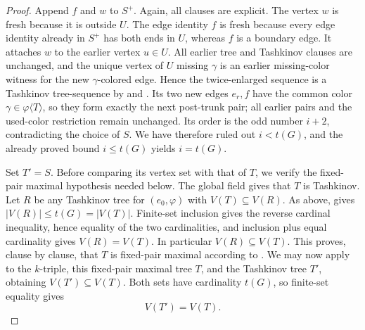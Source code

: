 \begin{proof}
Append $f$ and $w$ to $S^+$.  Again, all clauses are explicit.  The
vertex $w$ is fresh because it is outside $U$.  The edge identity $f$ is
fresh because every edge identity already in $S^+$ has both ends in $U$,
whereas $f$ is a boundary edge.  It attaches $w$ to the earlier vertex
$u\in U$.  All earlier tree and Tashkinov clauses are unchanged, and the
unique vertex of $U$ missing $\gamma$ is an earlier missing-color witness
for the new $\gamma$-colored edge.  Hence the twice-enlarged sequence is a
Tashkinov tree-sequence by  and
.  Its two new edges $e_r,f$ have the common color
$\gamma\in\varphi\langle T\rangle$, so they form exactly the next
post-trunk pair; all earlier pairs and the used-color restriction remain
unchanged.  Its order is the odd number $i+2$, contradicting the choice of
$S$.  We have therefore ruled out $i<t(G)$, and the already proved bound
$i\leq t(G)$ yields $i=t(G)$.

Set $T'=S$.  Before comparing its vertex set with that of $T$, we verify
the fixed-pair maximal hypothesis needed below.  The global field gives
that $T$ is Tashkinov.  Let $R$ be any Tashkinov tree for
$(e_0,\varphi)$ with $V(T)\subseteq V(R)$.  As above,
 gives $|V(R)|\leq t(G)=|V(T)|$.  Finite-set
inclusion gives the reverse cardinal inequality, hence equality of the
two cardinalities, and inclusion plus equal cardinality gives
$V(R)=V(T)$.  In particular $V(R)\subseteq V(T)$.  This proves, clause by
clause, that $T$ is fixed-pair maximal according to
.  We may now apply
 to the $k$-triple, this
fixed-pair maximal tree $T$, and the Tashkinov tree $T'$, obtaining
$V(T')\subseteq V(T)$.  Both sets have cardinality $t(G)$, so finite-set
equality gives
\[
 V(T')=V(T).
\]


\end{proof}
